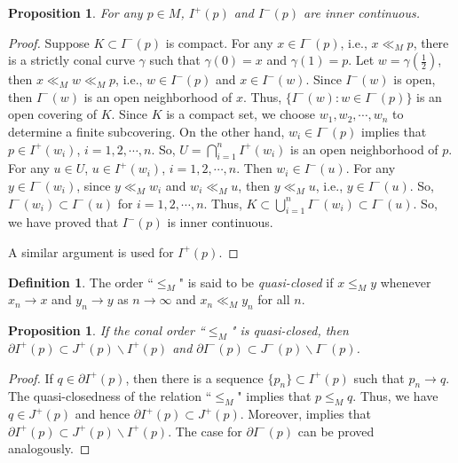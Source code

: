 \documentclass[a4paper,11pt]{article}
\theoremstyle{plain}
\newtheorem{prop}[thm]{Proposition}
\theoremstyle{definition}
\newtheorem{defn}[thm]{Definition}
\numberwithin{equation}{section}
\begin{document}
\begin{prop}\label{innercontinuous}
	For any $p\in M$, $I^{+}(p)$ and $I^-(p)$ are inner continuous.
\end{prop}	

\begin{proof}
	Suppose $K\subset I^{-}(p)$ is compact. For any $x\in I^-(p)$, i.e., $x\ll_M p$, there is a strictly conal curve $\gamma$ such that $\gamma (0)=x$ and $\gamma(1)=p$. Let $w=\gamma(\frac{1}{2})$, then $x\ll_M w\ll_M p$, i.e., $w\in I^-(p)$ and $x\in I^-(w)$. Since $I^-(w)$ is open, then $I^-(w)$ is an open neighborhood of $x$. Thus, $\{I^-(w): w\in I^-(p)\}$ is an open covering of $K$. Since $K$ is a compact set, we choose $w_1, w_2, \cdots, w_n$ to determine a finite subcovering. On the other hand, $w_i\in I^-(p)$ implies that $p\in I^+(w_i)$, $i=1,2,\cdots, n$. So, $U=\bigcap^{n}_{i=1}I^+(w_i)$ is an open neighborhood of $p$. For any $u\in U$, $u\in I^+(w_i)$, $i=1,2,\cdots, n$. Then $w_i\in I^-(u)$. For any $y\in I^-(w_i)$, since $y\ll_M w_i$ and $w_i\ll_M u$, then $y\ll_M u$, i.e., $y\in I^-(u)$. So, $I^-(w_i)\subset I^-(u)$ for $i=1,2,\cdots,n$. Thus, $K\subset \bigcup ^{n}_{i=1}I^-(w_i)\subset I^-(u)$. So, we have proved that $I^{-}(p)$ is inner continuous.
	
	A similar argument is used for $I^+(p)$.
\end{proof}


\begin{defn}\label{quasi-closed}
	The order ``$\leq_M$" is said to be \textit{quasi-closed} if $x\leq_M y$ whenever $x_n\to x$ and $y_n\to y$ as $n\to \infty$ and $x_n\ll_M y_n$ for all $n$.
\end{defn}

\begin{prop}\label{quasi-closed-prop}
	If the conal order ``$\leq_M$" is quasi-closed, then $\partial I^{+}(p)\subset J^{+}(p)\backslash I^{+}(p)$ and $\partial I^{-}(p)\subset J^{-}(p)\backslash I^{-}(p)$.
\end{prop}	

\begin{proof}
	If $q\in \partial I^{+}(p)$, then there is a sequence $\{p_n\}\subset I^{+}(p)$ such that $p_n \to q$. The quasi-closedness of the relation ``$\leq_M$" implies that $p\leq_M q$. Thus, we have $q\in J^{+}(p)$ and hence $\partial I^{+}(p)\subset J^{+}(p)$. Moreover, \cite[Proposition 3.4]{Penrose72} implies that $\partial I^{+}(p)\subset J^{+}(p)\backslash I^{+}(p)$. The case for $\partial I^{-}(p)$ can be proved analogously.
\end{proof}
\end{document}
